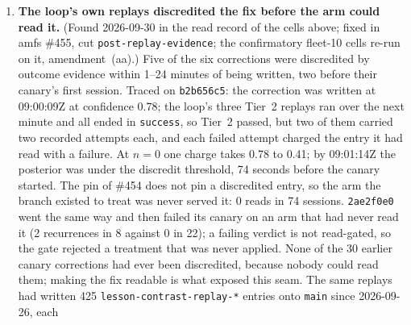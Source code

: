 \documentclass[11pt]{article}
\newcommand{\code}[1]{\texttt{#1}}
\begin{document}
\begin{enumerate}[leftmargin=1.6em, itemsep=0.35em]
that still had the old one. The rule now admits a platform-authored entry on a path where one of
the caller's own agents has written, never account-wide; on the benchmark account that covers
318 of 318 corrections and 168 of 168 corrective entries. One limitation survives: the loop
writes a correction at $0.8\times$ the confidence of the version it replaces (floor 0.3) while
the benchmark's agents read at a confidence gate of 0.5, so of the 31 shipped fixes that carry a
correction, 20 sit below the gate on \code{main}, visible but not read there; on the canary
branch the pin carries the correction to the head regardless. The re-measurement (the four
\code{rsi-conf-e2b} cells, six canaries) was the first time a canary arm read its fix: 17 reads
in 23 graded canary-arm sessions for the one fix that rewrote an existing key
(\code{repo-readme-ci}, 74\,\%), and 0, 0, 1, 1, 1 for the five that wrote a new key. P13$''$
was falsified (1, 1, 8.5, 0.5) and P16 pooled was 20 of 108 graded sessions, 19.8\,\%, at the
falsification line. That one fix was read and five were not is finding~13.
\item \textbf{The loop's own replays discredited the fix before the arm could read it.} (Found
2026-09-30 in the read record of the cells above; fixed in amfs \#455, cut
\code{post-replay-evidence}; the confirmatory fleet-10 cells re-run on it, amendment~(aa).)
Five of the six corrections were discredited by outcome evidence within 1--24 minutes of being
written, two before their canary's first session. Traced on \code{b2b656c5}: the correction was
written at 09:00:09Z at confidence 0.78; the loop's three Tier~2 replays ran over the next
minute and all ended in \code{success}, so Tier~2 passed, but two of them carried two recorded
attempts each, and each failed attempt charged the entry it had read with a failure. At $n=0$
one charge takes 0.78 to 0.41; by 09:01:14Z the posterior was under the discredit threshold, 74
seconds before the canary started. The pin of \#454 does not pin a discredited entry, so the arm
the branch existed to treat was never served it: 0 reads in 74 sessions. \code{2ae2f0e0} went
the same way and then failed its canary on an arm that had never read it (2 recurrences in 8
against 0 in 22); a failing verdict is not read-gated, so the gate rejected a treatment that was
never applied. None of the 30 earlier canary corrections had ever been discredited, because
nobody could read them; making the fix readable is what exposed this seam. The same replays had
written 425 \code{lesson-contrast-replay-*} entries onto \code{main} since 2026-09-26, each

\end{enumerate}
\end{document}

